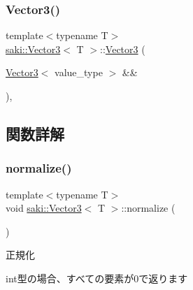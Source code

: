 \mbox{\label{classsaki_1_1_vector3_adc58d81fc6c31626460d9f02e6c768c2}} 
\subsubsection{\texorpdfstring{Vector3()}{Vector3()}\hspace{0.1cm}{\footnotesize\ttfamily [5/5]}}
{\footnotesize\ttfamily template$<$typename T$>$ \\
\mbox{\hyperlink{classsaki_1_1_vector3}{saki\+::\+Vector3}}$<$ T $>$\+::\mbox{\hyperlink{classsaki_1_1_vector3}{Vector3}} (\begin{DoxyParamCaption}\item[{\mbox{\hyperlink{classsaki_1_1_vector3}{Vector3}}$<$ value\+\_\+type $>$ \&\&}]{ }\end{DoxyParamCaption})\hspace{0.3cm}{\ttfamily [default]}, {\ttfamily [noexcept]}}



\subsection{関数詳解}
\mbox{\label{classsaki_1_1_vector3_a7b9496274bab6ea6147e6a09e1493110}} 
\subsubsection{\texorpdfstring{normalize()}{normalize()}}
{\footnotesize\ttfamily template$<$typename T$>$ \\
void \mbox{\hyperlink{classsaki_1_1_vector3}{saki\+::\+Vector3}}$<$ T $>$\+::normalize (\begin{DoxyParamCaption}{ }\end{DoxyParamCaption})\hspace{0.3cm}{\ttfamily [inline]}}



正規化 

int型の場合、すべての要素が0で返ります \mbox{\label{classsaki_1_1_vector3_abcfc63ddcaa8c7f148debedbe7fca788}} 
